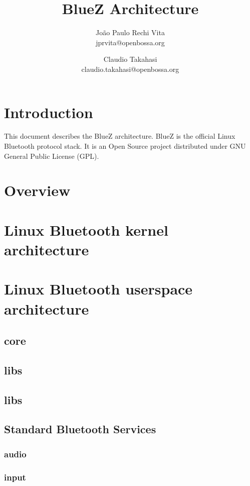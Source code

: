 \documentclass[11pt]{article}
\title{BlueZ Architecture}
\author{João Paulo Rechi Vita \\
			jprvita@openbossa.org
		\and
		Claudio Takahasi \\
		claudio.takahasi@openbossa.org}
\begin{document}
\maketitle
\newpage

\tableofcontents
\newpage

\section{Introduction}

This document describes the BlueZ architecture. BlueZ is the official Linux
Bluetooth protocol stack. It is an Open Source project distributed under GNU
General Public License (GPL).


\section{Overview}

\section{Linux Bluetooth kernel architecture}

\section{Linux Bluetooth userspace architecture}

\subsection{core}

\subsection{libs}

\subsection{libs}

\subsection{Standard Bluetooth Services}

\subsubsection{audio}
\subsubsection{input}
\end{document}
